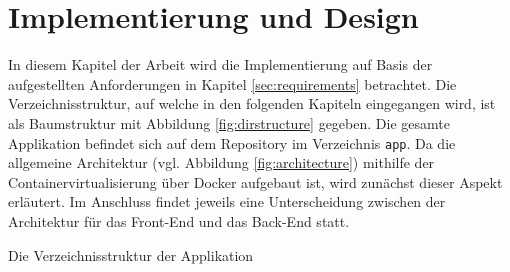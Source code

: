 \chapter{Implementierung und Design}
\label{sec:implementation}
In diesem Kapitel der Arbeit wird die Implementierung auf Basis der aufgestellten Anforderungen in Kapitel \ref{sec:requirements} betrachtet. Die Verzeichnisstruktur, auf welche in den folgenden Kapiteln eingegangen wird, ist als Baumstruktur mit Abbildung \ref{fig:dirstructure} gegeben. Die gesamte Applikation befindet sich auf dem Repository im Verzeichnis \texttt{app}. Da die allgemeine Architektur (vgl. Abbildung \ref{fig:architecture}) mithilfe der Containervirtualisierung über Docker aufgebaut ist, wird zunächst dieser Aspekt erläutert. Im Anschluss findet jeweils eine Unterscheidung zwischen der Architektur für das Front-End und das Back-End statt.

\begin{marginfigure}
    \centering
    \begin{adjustbox}{width=\textwidth}
    \end{adjustbox}
    \caption{Die Verzeichnisstruktur der Applikation}
    \label{fig:dirstructure}
\end{marginfigure}

